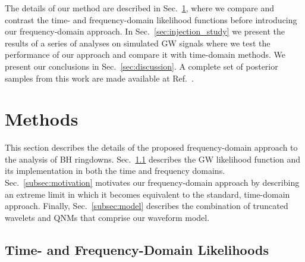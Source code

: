The details of our method are described in Sec.~\ref{sec:methods}, where we compare and contrast the time- and frequency-domain likelihood functions before introducing our frequency-domain approach.
In Sec.~\ref{sec:injection_study} we present the results of a series of analyses on simulated GW signals where we test the performance of our approach and compare it with time-domain methods.
We present our conclusions in Sec.~\ref{sec:discussion}.
A complete set of posterior samples from this work are made available at Ref.~\cite{finch_eliot_2021_5569759}.


\section{Methods}\label{sec:methods}

This section describes the details of the proposed frequency-domain approach to the analysis of BH ringdowns. 
Sec.~\ref{subsec:data_analysis} describes the GW likelihood function and its implementation in both the time and frequency domains.
Sec.~\ref{subsec:motivation} motivates our frequency-domain approach by describing an extreme limit in which it becomes equivalent to the standard, time-domain approach.
Finally, Sec.~\ref{subsec:model} describes the combination of truncated wavelets and QNMs that comprise our waveform model.


\subsection{Time- and Frequency-Domain Likelihoods}\label{subsec:data_analysis}

